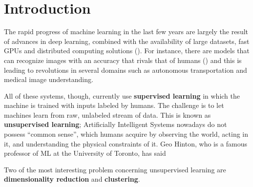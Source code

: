 
\section{Introduction}

The rapid progress of machine learning in the last few years are largely the result of advances in deep learning, combined with the availability of large datasets, fast GPUs and distributed computing solutions (\citet{zoe}). For instance, there are models that can recognize images with an accuracy that rivals that of humans (\citet{dgp}) and this is leading to revolutions in several domains such as autonomous transportation and medical image understanding.


All of these systems, though, currently use \textbf{supervised learning} in which the machine is trained with inputs labeled by humans. The challenge is to let machines learn from raw, unlabeled stream of data. This is known as \textbf{unsupervised learning}; Artificially Intelligent Systems nowadays do not possess ``common sense'', which humans acquire by observing the world, acting in it, and understanding the physical constraints of it. Geo  Hinton, who is a famous professor of ML at the University of Toronto, has said


Two of the most interesting problem concerning unsupervised learning are \textbf{dimensionality reduction} and \textbf{clustering}.



